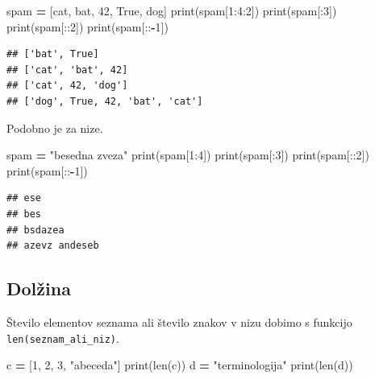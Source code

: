 \documentclass[
]{report}
\newenvironment{Shaded}{\begin{snugshade}}{\end{snugshade}}
\newcommand{\BuiltInTok}[1]{#1}
\newcommand{\DecValTok}[1]{\textcolor[rgb]{0.00,0.00,0.81}{#1}}
\newcommand{\NormalTok}[1]{#1}
\newcommand{\OperatorTok}[1]{\textcolor[rgb]{0.81,0.36,0.00}{\textbf{#1}}}
\newcommand{\StringTok}[1]{\textcolor[rgb]{0.31,0.60,0.02}{#1}}
\newcommand{\VariableTok}[1]{\textcolor[rgb]{0.00,0.00,0.00}{#1}}
\begin{document}
\begin{Shaded}
\begin{Highlighting}[]
\NormalTok{spam }\OperatorTok{=}\NormalTok{ [}\StringTok{\textquotesingle{}cat\textquotesingle{}}\NormalTok{, }\StringTok{\textquotesingle{}bat\textquotesingle{}}\NormalTok{, }\DecValTok{42}\NormalTok{, }\VariableTok{True}\NormalTok{, }\StringTok{\textquotesingle{}dog\textquotesingle{}}\NormalTok{]}
\BuiltInTok{print}\NormalTok{(spam[}\DecValTok{1}\NormalTok{:}\DecValTok{4}\NormalTok{:}\DecValTok{2}\NormalTok{])}
\BuiltInTok{print}\NormalTok{(spam[:}\DecValTok{3}\NormalTok{])}
\BuiltInTok{print}\NormalTok{(spam[::}\DecValTok{2}\NormalTok{])}
\BuiltInTok{print}\NormalTok{(spam[::}\OperatorTok{{-}}\DecValTok{1}\NormalTok{])}
\end{Highlighting}
\end{Shaded}

\begin{verbatim}
## ['bat', True]
## ['cat', 'bat', 42]
## ['cat', 42, 'dog']
## ['dog', True, 42, 'bat', 'cat']
\end{verbatim}

Podobno je za nize.

\begin{Shaded}
\begin{Highlighting}[]
\NormalTok{spam }\OperatorTok{=} \StringTok{"besedna zveza"}
\BuiltInTok{print}\NormalTok{(spam[}\DecValTok{1}\NormalTok{:}\DecValTok{4}\NormalTok{])}
\BuiltInTok{print}\NormalTok{(spam[:}\DecValTok{3}\NormalTok{])}
\BuiltInTok{print}\NormalTok{(spam[::}\DecValTok{2}\NormalTok{])}
\BuiltInTok{print}\NormalTok{(spam[::}\OperatorTok{{-}}\DecValTok{1}\NormalTok{])}
\end{Highlighting}
\end{Shaded}

\begin{verbatim}
## ese
## bes
## bsdazea
## azevz andeseb
\end{verbatim}

\hypertarget{dolux17eina}{%
\subsection{Dolžina}\label{dolux17eina}}

Število elementov seznama ali število znakov v nizu dobimo s funkcijo \texttt{len(seznam\_ali\_niz)}.

\begin{Shaded}
\begin{Highlighting}[]
\NormalTok{c }\OperatorTok{=}\NormalTok{ [}\DecValTok{1}\NormalTok{, }\DecValTok{2}\NormalTok{, }\DecValTok{3}\NormalTok{, }\StringTok{"abeceda"}\NormalTok{]}
\BuiltInTok{print}\NormalTok{(}\BuiltInTok{len}\NormalTok{(c))}
\NormalTok{d }\OperatorTok{=} \StringTok{"terminologija"}
\BuiltInTok{print}\NormalTok{(}\BuiltInTok{len}\NormalTok{(d))}
\end{Highlighting}
\end{Shaded}
\end{document}
